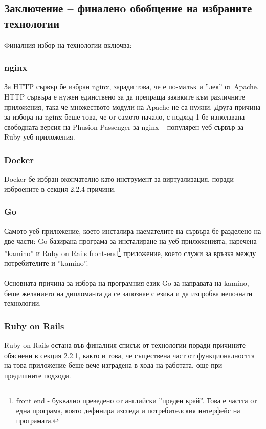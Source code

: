 \documentclass[pdftex,14pt,a4paper]{extreport}
\begin{document}
\subsection {Заключение – финаленo обобщение на избраните технологии}
Финалния избор на технологии включва:
\subsubsection {nginx}
За HTTP сървър бе избран nginx, заради това, че е по-малък и ''лек'' от Apache. HTTP сървъра е нужен единствено за да препраща заявките към различните приложения, така че множеството модули на Apache не са нужни. Друга причина за избора на nginx беше това, че от самото начало, с подход 1 бе използвана свободната версия на Phusion Passenger за nginx – популярен уеб сървър за Ruby уеб приложения.
\subsubsection {Docker}
Docker бе избран окончателно като инструмент за виртуализация, поради изброените в секция 2.2.4 причини.
\subsubsection {Go}
Самото уеб приложение, което инсталира наемателите на сървъра бе разделено на две части: Go-базирана програма за инсталиране на уеб приложенията, наречена ''kamino'' и Ruby on Rails front-end\footnote {front end - буквално преведено от английски ''преден край''. Това е частта от една програма, която дефинира изгледа и потребителския интерфейс на програмата.} приложение, което служи за връзка между потребителите и ''kamino''.\\\\
Основната причина за избора на програмния език Go за направата на kamino, беше желанието на дипломанта да се запознае с езика и да изпробва непознати технологии.
\subsubsection {Ruby on Rails}
Ruby on Rails остана във финалния списък от технологии поради причините обяснени в секция 2.2.1, както и това, че съществена част от функционалността на това приложение беше вече изградена в хода на работата, още при предишните подходи.
\end{document}
